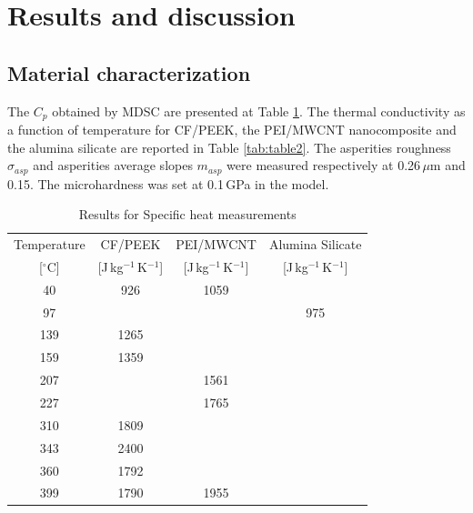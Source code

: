 \documentclass[review,times,sagev,doublespace]{sagej}
\begin{document}
\FloatBarrier
\section{Results and discussion}

	\subsection{Material characterization}

The $C_p$ obtained by MDSC are presented at Table \ref{tab:table1}. 
The thermal conductivity as a function of temperature for CF/PEEK, the PEI/MWCNT nanocomposite and the alumina silicate are reported in Table \ref{tab:table2}. 
The asperities roughness $\sigma_{asp}$ and asperities average slopes $m_{asp}$ were measured respectively at \mbox{0.26\,$\mu$m} and 0.15. 
The microhardness was set at \mbox{0.1\,GPa} in the model. 

\begin{table}[ht]
	\centering
	\begin{tabular}{@{}cccc@{}}
		\toprule
		Temperature   & CF/PEEK                  & PEI/MWCNT                & Alumina Silicate         \\
		{[}$^{\circ}$C{]} & {[}J\,kg$^{-1}$\,K$^{-1}${]} & {[}J\,kg$^{-1}$\,K$^{-1}${]} & {[}J\,kg$^{-1}$\,K$^{-1}${]} \\ \midrule
		40            & 926                      & 1059                     &                          \\
		97            &                          &                          & 975                      \\
		139           & 1265                     &                          &                          \\
		159           & 1359                     &                          &                          \\
		207           &                          & 1561                     &                          \\
		227           &                          & 1765                     &                          \\
		310           & 1809                     &                          &                          \\
		343           & 2400                     &                          &                          \\
		360           & 1792                     &                          &                          \\
		399           & 1790                     & 1955                     &                          \\ \bottomrule
	\end{tabular}
	\caption{Results for Specific heat measurements}
	\label{tab:table1}
\end{table}
\end{document}
